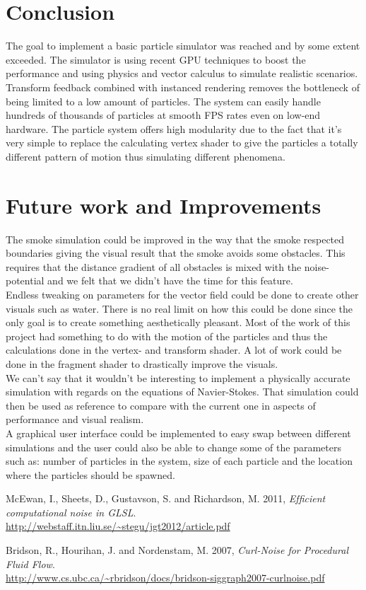\documentclass[report]{vgtc}
\begin{document}
\section{Conclusion}
The goal to implement a basic particle simulator was reached and by some extent exceeded. The simulator is using recent GPU techniques to boost the performance and using physics and vector calculus to simulate realistic scenarios. Transform feedback combined with instanced rendering removes the bottleneck of being limited to a low amount of particles. The system can easily handle hundreds of thousands of particles at smooth FPS rates even on low-end hardware. The particle system offers high modularity due to the fact that it’s very simple to replace the calculating vertex shader to give the particles a totally different pattern of motion thus simulating different phenomena.

\section{Future work and Improvements}
The smoke simulation could be improved in the way that the smoke respected boundaries giving the visual result that the smoke avoids some obstacles. This requires that the distance gradient of all obstacles is mixed with the noise-potential and we felt that we didn’t have the time for this feature. \\
Endless tweaking on parameters for the vector field could be done to create other visuals such as water. There is no real limit on how this could be done since the only goal is to create something aesthetically pleasant. Most of the work of this project had something to do with the motion of the particles and thus the calculations done in the vertex- and transform shader. A lot of work could be done in the fragment shader to drastically improve the visuals.\\
We can’t say that it wouldn’t be interesting to implement a physically accurate simulation with regards on the equations of Navier-Stokes. That simulation could then be used as reference to compare with the current one in aspects of performance and visual realism. \\
A graphical user interface could be implemented to easy swap between different simulations and the user could also be able to change some of the parameters such as: number of particles in the system, size of each particle and the location where the particles should be spawned. 


	

\begin{thebibliography}{9}
  McEwan, I., Sheets, D., Gustavson, S. and Richardson, M. 2011,
  \emph{Efﬁcient computational noise in GLSL}.\\
\url{http://webstaff.itn.liu.se/~stegu/jgt2012/article.pdf}

  Bridson, R., Hourihan, J. and Nordenstam, M. 2007,
  \emph{Curl-Noise for Procedural Fluid Flow}.\\
\url{http://www.cs.ubc.ca/~rbridson/docs/bridson-siggraph2007-curlnoise.pdf}
\end{thebibliography}
\end{document}

